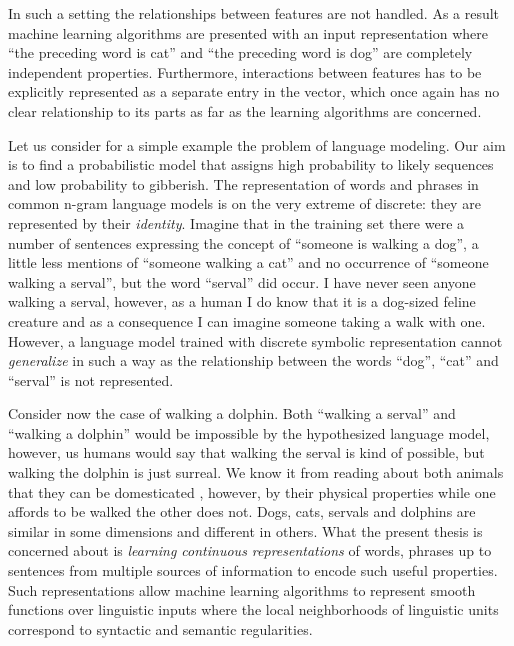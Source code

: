 In such a setting the relationships between features are not handled.
As a result machine learning algorithms are presented with an input representation where
``the preceding word is cat'' and ``the preceding word is dog''
are completely independent properties.
Furthermore, interactions between features has to be
explicitly represented as a separate entry in the vector, which once again has
no clear relationship to its parts as far as the learning algorithms are concerned.

Let us consider for a simple example the problem of language modeling.
Our  aim is to find a probabilistic model
that assigns high probability to likely sequences and low probability to gibberish.
The representation of words and phrases in common n-gram language models is on the
very extreme of discrete: they are represented by their \emph{identity}.
Imagine that in the training set there were a number of sentences expressing the concept
of ``someone is walking a dog'', a little less mentions of ``someone walking a cat''
and no occurrence of ``someone walking a serval'', but the word ``serval'' did occur.
I have never seen anyone walking a serval, however, as a human I do know that it is a dog-sized
feline creature and as a consequence I can imagine someone taking a walk with one.
However, a language model trained with discrete symbolic representation cannot
\emph{generalize} in such a way as the
relationship between the words ``dog'', ``cat'' and ``serval'' is not represented.

Consider now the case of walking a dolphin.
Both ``walking a serval'' and ``walking a dolphin'' would be impossible
by the hypothesized language model, however, us humans would say that walking the serval is
kind of possible, but walking the dolphin is just surreal.
We know it from reading about both animals that they can be domesticated
, however, by their physical properties while one affords to be walked
the other does not. Dogs, cats, servals and dolphins are similar in some
dimensions and different in others.
What the present thesis is concerned about is
\emph{learning continuous representations} of words, phrases up to sentences
from multiple sources of information to encode such useful properties.
Such representations allow machine learning algorithms to represent smooth
functions over linguistic inputs where the local neighborhoods of linguistic
units correspond to syntactic and semantic regularities.

